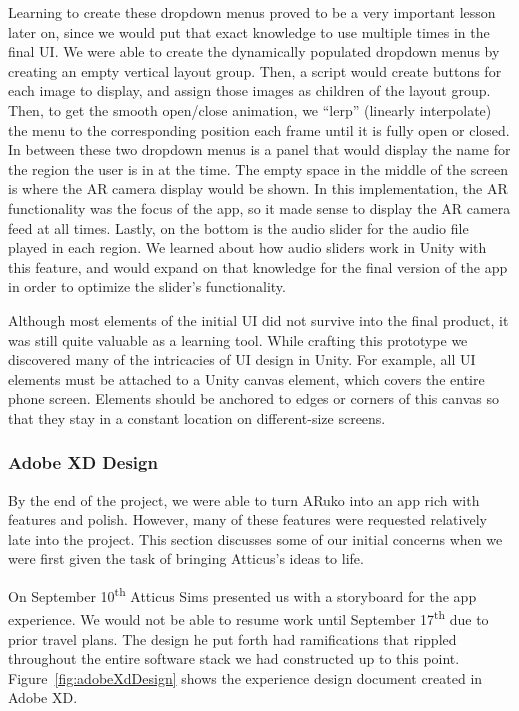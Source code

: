 \documentclass[a4paper, 10pt, american, titlepage]{article}
\begin{document}
Learning to create these dropdown menus proved to be a very important lesson
later on, since we would put that exact knowledge to use multiple times in the
final UI. We were able to create the dynamically populated dropdown menus by
creating an empty vertical layout group. Then, a script would create buttons for
each image to display, and assign those images as children of the layout group.
Then, to get the smooth open/close animation, we ``lerp'' (linearly interpolate)
the menu to the corresponding position each frame until it is fully open or
closed. In between these two dropdown menus is a panel that would display the
name for the region the user is in at the time. The empty space in the middle of
the screen is where the AR camera display would be shown. In this
implementation, the AR functionality was the focus of the app, so it made sense
to display the AR camera feed at all times. Lastly, on the bottom is the audio
slider for the audio file played in each region. We learned about how audio
sliders work in Unity with this feature, and would expand on that knowledge for
the final version of the app in order to optimize the slider's functionality.

Although most elements of the initial UI did not survive into the final product,
it was still quite valuable as a learning tool. While crafting this prototype we
discovered many of the intricacies of UI design in Unity. For example, all UI
elements must be attached to a Unity canvas element, which covers the entire
phone screen. Elements should be anchored to edges or corners of this canvas so
that they stay in a constant location on different-size screens.

\subsubsection{Adobe XD Design}
\label{sec:adobeXdDesign}

By the end of the project, we were able to turn ARuko into an app rich with
features and polish. However, many of these features were requested relatively
late into the project. This section discusses some of our initial concerns when
we were first given the task of bringing Atticus's ideas to life.

On September 10\textsuperscript{th} Atticus Sims presented us with a storyboard
for the app experience. We would not be able to resume work until September
17\textsuperscript{th} due to prior travel plans. The design he put forth had
ramifications that rippled throughout the entire software stack we had
constructed up to this point. Figure~\ref{fig:adobeXdDesign} shows the
experience design document created in Adobe XD.
\end{document}
